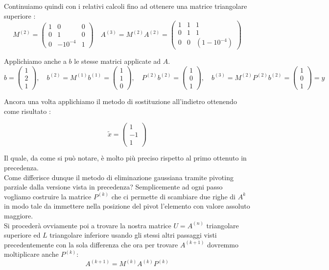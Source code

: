 \documentclass[12pt, a4paper]{book}
\theoremstyle{definition}
\begin{document}
\begin{flushleft}
Continuiamo quindi con i relativi calcoli fino ad ottenere una matrice triangolare superiore : 
\[ 
	M^{(2)} =
	\begin{pmatrix}
		 1 & 0 & 0 \\
		 0 & 1 & 0 \\
		 0 & -10^{-4} & 1 
	\end{pmatrix}	
	\quad
	A^{(3)} = M^{(2)}A^{(2)}= 
	\begin{pmatrix}
		 1 & 1 & 1 \\
		 0 & 1 & 1 \\
		 0 & 0 & (1 - 10^{-4})
	\end{pmatrix}	
\]

Applichiamo anche a $b$ le stesse matrici applicate ad $A$.
\[ 
	b = 
	\begin{pmatrix}
		 1 \\
		 2 \\
		 1 
	\end{pmatrix},
	\quad
	b^{(2)}  = M^{(1)}b^{(1)} = 
	\begin{pmatrix}
		 1 \\
		 1 \\
		 0
	\end{pmatrix},
	\quad
	P^{(2)}b^{(2)}  =
	 \begin{pmatrix}
		 1 \\
		 0 \\
		 1
	\end{pmatrix},
	\quad
	b^{(3)} = M^{(2)}P^{(2)}b^{(2)}  =
	\begin{pmatrix}
		 1 \\
		 0 \\
		 1
	\end{pmatrix}
	=y
\]

Ancora una volta applichiamo il metodo di sostituzione all'indietro ottenendo come risultato : 

\[ 	
	\tilde{x} = 
	\begin{pmatrix}
		 1 \\
		 -1 \\
		 1
	\end{pmatrix}
\]

Il quale, da come si può notare, è molto più preciso rispetto al primo ottenuto in precedenza.\\

Come differisce dunque il metodo di eliminazione gaussiana tramite pivoting parziale dalla versione vista in precedenza? Semplicemente ad ogni passo vogliamo costruire la matrice $P^{(k)}$  che ci permette di scambiare due righe di $A^{k}$ in modo tale da immettere nella posizione del pivot l'elemento con valore assoluto maggiore.\\
\vspace{1em}
Si procederà ovviamente poi a trovare la nostra matrice $U = A^{(n)}$ triangolare superiore ed $L$ triangolare inferiore usando gli stessi altri passaggi visti precedentemente con la sola differenza che ora per trovare $A^{(k+1)}$ dovremmo moltiplicare anche $P^{(k)} $: 
\[ 
	A^{(k+1)} = M^{(k)}A^{(k)}P^{(k)}
\]


\end{flushleft}
\end{document}
